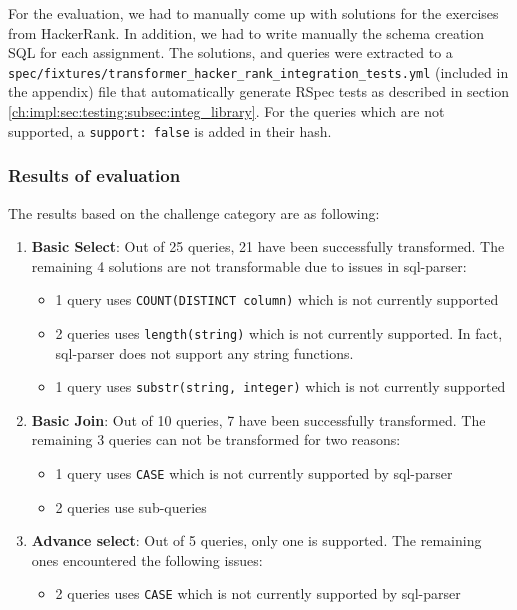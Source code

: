 For the evaluation, we had to manually come up with solutions for the exercises from HackerRank. In addition, we had to write manually the schema creation SQL for each assignment. The solutions, and queries were extracted to a \texttt{spec/fixtures/transformer\_hacker\_rank\_integration\_tests.yml} (included in the appendix) file that automatically generate RSpec tests as described in section \ref{ch:impl:sec:testing:subsec:integ_library}. For the queries which are not supported, a \texttt{support: false} is added in their hash.

\subsubsection{Results of evaluation}
The results based on the challenge category are as following:
\begin{enumerate}
    \item \textbf{Basic Select}: Out of 25 queries, 21 have been successfully transformed. The remaining 4 solutions are not transformable due to issues in sql-parser:
    \begin{itemize}
        \item 1 query uses \texttt{COUNT(DISTINCT column)} which is not currently supported
        \item 2 queries uses \texttt{length(string)} which is not currently supported. In fact, sql-parser does not support any string functions.
        \item 1 query uses \texttt{substr(string, integer)} which is not currently supported
    \end{itemize}
    \item \textbf{Basic Join}: Out of 10 queries, 7 have been successfully transformed. The remaining 3 queries can not be transformed for two reasons:
    \begin{itemize}
        \item 1 query uses \texttt{CASE} which is not currently supported by sql-parser
        \item 2 queries use sub-queries
    \end{itemize}
    \item \textbf{Advance select}: Out of 5 queries, only one is supported. The remaining ones encountered the following issues:
    \begin{itemize}
        \item 2 queries uses \texttt{CASE} which is not currently supported by sql-parser

\end{itemize}
\end{enumerate}
